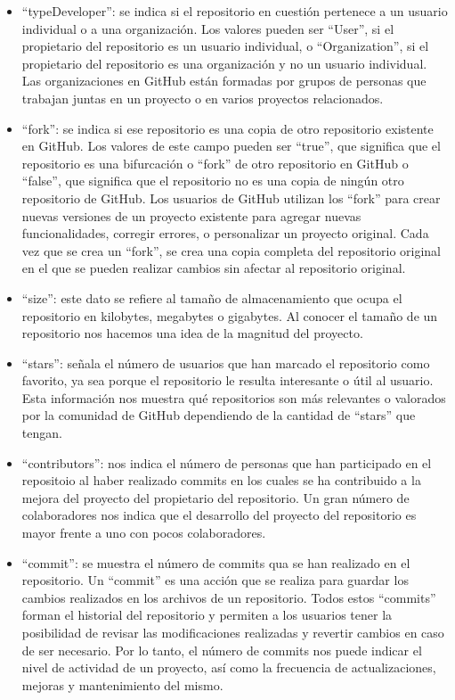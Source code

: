 \documentclass[a4paper, 12pt]{book}
\begin{document}
\begin{itemize}
  \item ``typeDeveloper'': se indica si el repositorio en cuestión pertenece a un usuario individual o a una organización. 
  Los valores pueden ser ``User'', si el propietario del repositorio es un usuario individual, o ``Organization'', si el propietario del repositorio es una organización y no un usuario individual. 
  Las organizaciones en GitHub están formadas por grupos de personas que trabajan juntas en un proyecto o en varios proyectos relacionados.
  
  \item ``fork'': se indica si ese repositorio es una copia de otro repositorio existente en GitHub. 
  Los valores de este campo pueden ser ``true'', que significa que el repositorio es una bifurcación o ``fork'' de otro repositorio en GitHub o ``false'', que significa que el repositorio no es una copia de ningún otro repositorio de GitHub.
  Los usuarios de GitHub utilizan los ``fork'' para crear nuevas versiones de un proyecto existente para agregar nuevas funcionalidades, corregir errores, o personalizar un proyecto original.
  Cada vez que se crea un ``fork'', se crea una copia completa del repositorio original en el que se pueden realizar cambios sin afectar al repositorio original.
  
  \item ``size'': este dato se refiere al tamaño de almacenamiento que ocupa el repositorio en kilobytes, megabytes o gigabytes.  
  Al conocer el tamaño de un repositorio nos hacemos una idea de la magnitud del proyecto.

  \item ``stars'': señala el número de usuarios que han marcado el repositorio como favorito, ya sea porque el repositorio le resulta interesante o útil al usuario.
  Esta información nos muestra qué repositorios son más relevantes o valorados por la comunidad de GitHub dependiendo de la cantidad de ``stars'' que tengan.

  \item ``contributors'': nos indica el número de personas que han participado en el repositoio al haber realizado commits en los cuales se ha contribuido a la mejora del proyecto del propietario del repositorio.
  Un gran número de colaboradores nos indica que el desarrollo del proyecto del repositorio es mayor frente a uno con pocos colaboradores.
  
  \item ``commit'': se muestra el número de commits qua se han realizado en el repositorio.
  Un ``commit'' es una acción que se realiza para guardar los cambios realizados en los archivos de un repositorio.
  Todos estos ``commits'' forman el historial del repositorio y permiten a los usuarios tener la posibilidad de revisar las modificaciones realizadas y revertir cambios en caso de ser necesario. 
  Por lo tanto, el número de commits nos puede indicar el nivel de actividad de un proyecto, así como la frecuencia de actualizaciones, mejoras y mantenimiento del mismo.
 
\end{itemize} 
\end{document}
